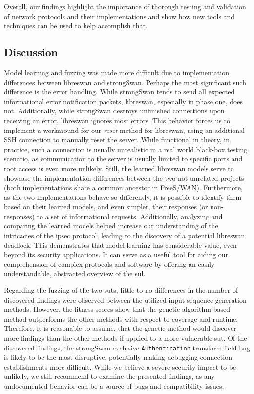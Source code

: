 Overall, our findings highlight the importance of thorough testing and validation of network protocols and their implementations and show how new tools and techniques can be used to help accomplish that.

\subsection{Discussion}
Model learning and fuzzing was made more difficult due to implementation differences between libreswan and strongSwan. Perhaps the most significant such difference is the error handling. While strongSwan tends to send all expected informational error notification packets, libreswan, especially in phase one, does not. Additionally, while strongSwan destroys unfinished connections upon receiving an error, libreswan ignores most errors. This behavior forces us to implement a workaround for our \emph{reset} method for libreswan, using an additional SSH connection to manually reset the server. While functional in theory, in practice, such a connection is usually unrealistic in a real world black-box testing scenario, as communication to the server is usually limited to specific ports and root access is even more unlikely. Still, the learned libreswan models serve to showcase the implementation differences between the two not unrelated projects (both implementations share a common ancestor in FreeS/WAN). Furthermore, as the two implementations behave so differently, it is possible to identify them based on their learned models, and even simpler, their responses (or non-responses) to a set of informational requests. Additionally, analyzing and comparing the learned models helped increase our understanding of the intricacies of the \ac{ipsec} protocol, leading to the discovery of a potential libreswan deadlock. This demonstrates that model learning has considerable value, even beyond its security applications. It can serve as a useful tool for aiding our comprehension of complex protocols and software by offering an easily understandable, abstracted overview of the \ac{sul}.

Regarding the fuzzing of the two \acp{sut}, little to no differences in the number of discovered findings were observed between the utilized input sequence-generation methods. However, the fitness scores show that the genetic algorithm-based method outperforms the other methods with respect to coverage and runtime. Therefore, it is reasonable to assume, that the genetic method would discover more findings than the other methods if applied to a more vulnerable \ac{sut}. Of the discovered findings, the strongSwan exclusive \texttt{Authentication} transform field bug is likely to be the most disruptive, potentially making debugging connection establishments more difficult. While we believe a severe security impact to be unlikely, we still recommend to examine the presented findings, as any undocumented behavior can be a source of bugs and compatibility issues. 

